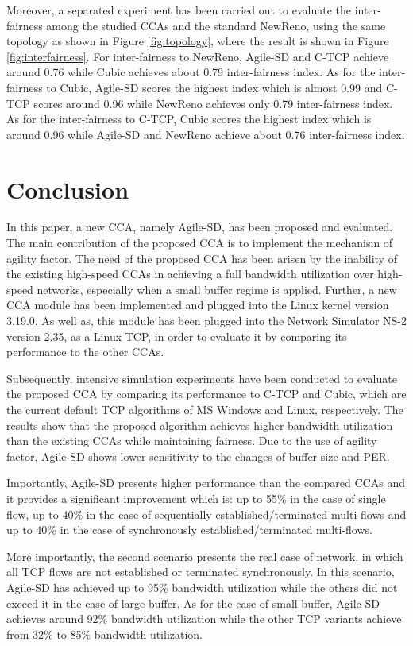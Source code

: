 \documentclass[preprint,3p,times,twocolumn,authoryear]{elsarticle}
\begin{document}
Moreover, a separated experiment has been carried out to evaluate the inter-fairness among the studied CCAs and the standard NewReno, using the same topology as shown in Figure \ref{fig:topology}, where the result is shown in Figure \ref{fig:interfairness}. For inter-fairness to NewReno, Agile-SD and C-TCP achieve around 0.76 while Cubic achieves about 0.79 inter-fairness index. As for the inter-fairness to Cubic, Agile-SD scores the highest index which is almost 0.99 and C-TCP scores around 0.96 while NewReno achieves only 0.79 inter-fairness index. As for the inter-fairness to C-TCP, Cubic scores the highest index which is around 0.96 while Agile-SD and NewReno achieve about 0.76 inter-fairness index.

\section{Conclusion}
\label{Conc}

In this paper, a new CCA, namely Agile-SD, has been proposed and evaluated. The main contribution of the proposed CCA is to implement the mechanism of agility factor. The need of the proposed CCA has been arisen by the inability of the existing high-speed CCAs in achieving a full bandwidth utilization over high-speed networks, especially when a small buffer regime is applied. Further, a new CCA module has been implemented and plugged into the Linux kernel version 3.19.0. As well as, this module has been plugged into the Network Simulator NS-2 version 2.35, as a Linux TCP, in order to evaluate it by comparing its performance to the other CCAs. 

Subsequently, intensive simulation experiments have been conducted to evaluate the proposed CCA by comparing its performance to C-TCP and Cubic, which are the current default TCP algorithms of MS Windows and Linux, respectively. The results show that the proposed algorithm achieves higher bandwidth utilization than the existing CCAs while maintaining fairness. Due to the use of agility factor, Agile-SD shows lower sensitivity to the changes of buffer size and PER.

Importantly, Agile-SD presents higher performance than the compared CCAs and it provides a significant improvement which is: up to 55\% in the case of single flow, up to 40\% in the case of sequentially established/terminated multi-flows and up to 40\% in the case of synchronously established/terminated multi-flows.

More importantly, the second scenario presents the real case of network, in which all TCP flows are not established or terminated synchronously. In this scenario, Agile-SD has achieved up to 95\% bandwidth utilization while the others did not exceed it in the case of large buffer. As for the case of small buffer, Agile-SD achieves around 92\% bandwidth utilization while the other TCP variants achieve from 32\% to 85\% bandwidth utilization.
\end{document}
